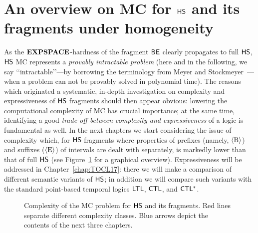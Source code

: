 \section{An overview on MC for $\text{\sffamily HS}$ and its fragments under homogeneity}
\label{sec:overvHomo}

As the $\textbf{EXPSPACE}$-hardness of the fragment $\mathsf{BE}$ clearly propagates to full $\text{\sffamily HS}$, $\text{\sffamily HS}$ MC represents a \emph{provably intractable problem} (here and in the following, we say \lq\lq intractable\rq\rq---by borrowing the terminology from Meyer and Stockmeyer~\cite{Stockmeyer:1973}---when a problem can not be provably solved in polynomial time).
%
The reasons which originated a systematic, in-depth investigation on complexity and expressiveness of $\text{\sffamily HS}$ fragments should then appear obvious: lowering the computational complexity of MC has crucial importance; at the same time, identifying a good \emph{trade-off between complexity and expressiveness} of a logic is fundamental as well. In the next chapters we start considering the issue of complexity which, for $\text{\sffamily HS}$ fragments where properties of prefixes (namely, $\operatorname{\langle B\rangle}$) and suffixes ($\operatorname{\langle E\rangle}$) of intervals are dealt with separately, is markedly lower than that of full $\text{\sffamily HS}$ (see Figure~\ref{fGr} for a graphical overview). Expressiveness will be addressed in Chapter~\ref{chap:TOCL17}: there we will make
a comparison of different semantic variants of $\text{\sffamily HS}$; %
in addition we will compare such variants with the standard point-based temporal logics $\text{\sffamily LTL}$, $\text{\sffamily CTL}$, and $\text{\sffamily CTL$^{*}$}$.

\begin{figure}[p]
\centering
    
    \caption{Complexity of the MC problem for $\text{\sffamily HS}$ and its fragments. Red lines separate different complexity classes. Blue arrows depict the contents of the next three chapters.}
    \label{fGr}
\end{figure}

